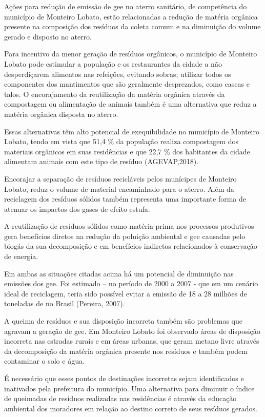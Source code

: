 Ações para redução de emissão de \gls{gee} no aterro sanitário, de competência do município de Monteiro Lobato, estão relacionadas a redução de matéria orgânica presente na composição dos resíduos da coleta comum e na diminuição do volume gerado e disposto no aterro. 

Para incentivo da menor geração de resíduos orgânicos, o município de Monteiro Lobato pode estimular a população e os restaurantes da cidade a não desperdiçarem alimentos nas refeições, evitando sobras; utilizar todos os componentes dos mantimentos que são geralmente desprezados, como cascas e talos. O encorajamento da reutilização da matéria orgânica através da compostagem ou alimentação de animais também é uma alternativa que reduz a matéria orgânica disposta no aterro.
 
Essas alternativas têm alto potencial de exequibilidade no município de Monteiro Lobato, tendo em vista que 51,4 \% da população realiza compostagem dos materiais orgânicos em suas residências e que 22,7 \% dos habitantes da cidade alimentam animais com este tipo de resíduo (AGEVAP,2018).

Encorajar a separação de resíduos recicláveis pelos munícipes de Monteiro Lobato, reduz o volume de material encaminhado para o aterro. Além da reciclagem dos resíduos sólidos também representa uma importante forma de atenuar os impactos dos gases de efeito estufa. 

A reutilização de resíduos sólidos como matéria-prima nos processos produtivos gera benefícios diretos na redução da poluição ambiental e \gls{gee} causadas pelo biogás da sua decomposição e em benefícios indiretos relacionados à conservação de energia. 

Em ambas as situações citadas acima há um potencial de diminuição nas emissões dos \gls{gee}. Foi estimado – no período de 2000 a 2007 - que em um cenário ideal de reciclagem, teria sido possível evitar a emissão de 18 a 28 milhões de toneladas de  no Brasil (Pereira, 2007). 

A queima de resíduos e sua disposição incorreta também são problemas que agravam a geração de \gls{gee}. Em Monteiro Lobato foi observado áreas de disposição incorreta nas estradas rurais e em áreas urbanas, que geram metano livre através da decomposição da matéria orgânica presente nos resíduos e também podem contaminar o solo e água. 

É necessário que esses pontos de destinações incorretas sejam identificados e inativados pela prefeitura do município. Uma alternativa para diminuir o índice de queimadas de resíduos realizadas nas residências é através da educação ambiental dos moradores em relação ao destino correto de seus resíduos gerados.  


